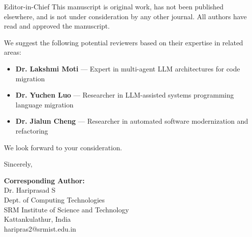 \documentclass[11pt]{letter}
\begin{document}
\begin{letter}{Editor-in-Chief}
This manuscript is original work, has not been published elsewhere, and is not under consideration by any other journal. All authors have read and approved the manuscript.

We suggest the following potential reviewers based on their expertise in related areas:

\begin{itemize}
    \item \textbf{Dr. Lakshmi Moti} --- Expert in multi-agent LLM architectures for code migration
    \item \textbf{Dr. Yuchen Luo} --- Researcher in LLM-assisted systems programming language migration
    \item \textbf{Dr. Jialun Cheng} --- Researcher in automated software modernization and refactoring
\end{itemize}

We look forward to your consideration.

\closing{Sincerely,}

\vspace{-0.3in}
\noindent \textbf{Corresponding Author:} \\
Dr. Hariprasad S \\
Dept. of Computing Technologies \\
SRM Institute of Science and Technology \\
Kattankulathur, India \\
haripras2@srmist.edu.in

\end{letter}
\end{document}
